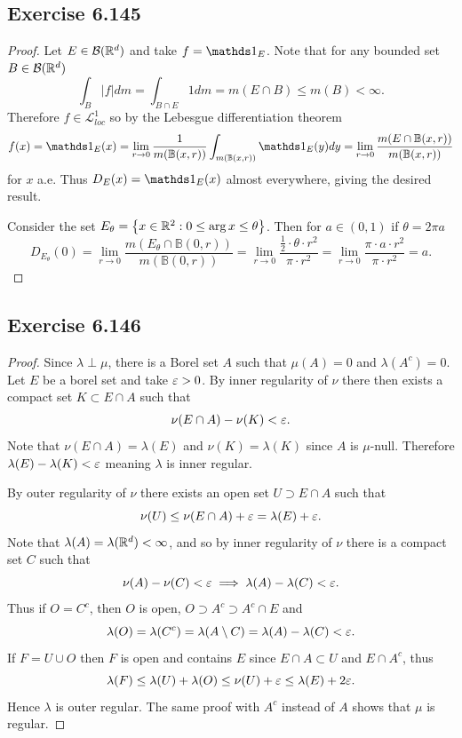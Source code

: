 \documentclass[hw_all.tex]{subfiles}
\begin{document}
\subsection{Exercise 6.145}
\begin{proof}
    Let $E \in \mathcal{B}(\mathbb{R}^d)$ and take $f = \ind{E}$. Note that for any bounded set $B \in \mathcal{B}(\mathbb{R}^d)$
    \[
        \int_{B} |f| dm = \int_{B \cap E} 1 dm = m(E \cap B) \leq m(B) < \infty
    .\]
    Therefore $f \in \mathcal{L}_{loc}^1$ so by the Lebesgue differentiation theorem
    \[
        f(x) = \ind{E}(x) = \lim_{r \to 0} \frac{1}{m(\mathbb{B}(x,r))} \int_{m(\mathbb{B}(x,r))} \ind{E}(y) dy = \lim_{r \to 0} \frac{m(E \cap \mathbb{B}(x,r))}{m(\mathbb{B}(x,r))}
    \]
    for $x$ a.e. Thus $D_E(x) = \ind{E}(x)$ almost everywhere, giving the desired result.

    Consider the set $E_{\theta} = \qty{x \in \mathbb{R}^2 : 0 \leq \arg x \leq \theta}$. Then for $a \in (0,1)$ if $\theta = 2 \pi a$
    \[
        D_{E_{\theta}}(0) = \lim_{r \to 0} \frac{m(E_{\theta} \cap \mathbb{B}(0, r))}{m(\mathbb{B}(0,r))} = \lim_{r \to 0} \frac{\frac{1}{2} \cdot \theta \cdot r^2}{\pi \cdot r^2} = \lim_{r \to 0} \frac{\pi \cdot a \cdot r^2}{\pi \cdot r^2} = a
    .\]
\end{proof}

\subsection{Exercise 6.146}
\begin{proof}
    Since $\lambda \perp \mu$, there is a Borel set $A$ such that $\mu(A) = 0$ and $\lambda(A^c) = 0$. Let $E$ be a borel set and take $\varepsilon > 0$. By inner regularity of $\nu$ there then exists a compact set $K \subset E \cap A$ such that
    \[
        \nu(E \cap A) - \nu(K) < \varepsilon
    .\]
    Note that $\nu(E \cap A) = \lambda(E)$ and $\nu(K) = \lambda(K)$ since $A$ is $\mu$-null. Therefore $\lambda(E) - \lambda(K) < \varepsilon$ meaning $\lambda$ is inner regular.

    By outer regularity of $\nu$ there exists an open set $U \supset E \cap A$ such that
    \[
        \nu(U) \leq \nu(E \cap A) + \varepsilon = \lambda(E) + \varepsilon
    .\]
    Note that $\lambda(A) = \lambda(\mathbb{R}^d) < \infty$, and so by inner regularity of $\nu$ there is a compact set $C$ such that
    \[
        \nu(A) - \nu(C) < \varepsilon \implies \lambda(A) - \lambda(C) < \varepsilon
    .\]
    Thus if $O = C^c$, then $O$ is open, $O \supset A^c \supset A^c \cap E$ and
    \[
        \lambda(O) = \lambda(C^c) = \lambda(A \setminus C) = \lambda(A) - \lambda(C) < \varepsilon
    .\]
    If $F = U \cup O$ then $F$ is open and contains $E$ since $E \cap A \subset U$ and $E \cap A^c$, thus
    \[
        \lambda(F) \leq \lambda(U) + \lambda(O) \leq \nu(U) + \varepsilon \leq \lambda(E) + 2 \varepsilon
    .\]
    Hence $\lambda$ is outer regular. The same proof with $A^c$ instead of $A$ shows that $\mu$ is regular.
\end{proof}
\end{document}
